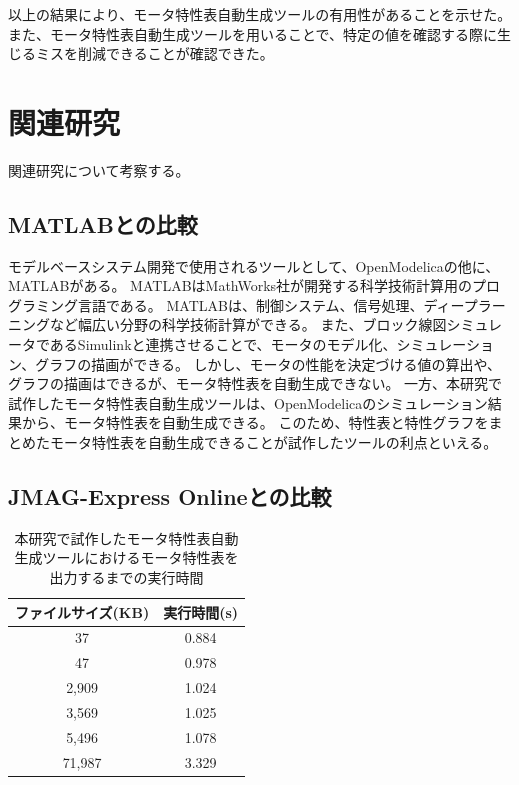 以上の結果により、モータ特性表自動生成ツールの有用性があることを示せた。また、モータ特性表自動生成ツールを用いることで、特定の値を確認する際に生じるミスを削減できることが確認できた。

\section{関連研究}
関連研究について考察する。

\subsection{MATLABとの比較}
モデルベースシステム開発で使用されるツールとして、OpenModelicaの他に、MATLAB\cite{}がある。
MATLABはMathWorks社が開発する科学技術計算用のプログラミング言語である。
MATLABは、制御システム、信号処理、ディープラーニングなど幅広い分野の科学技術計算ができる。
また、ブロック線図シミュレータであるSimulink\cite{}と連携させることで、モータのモデル化、シミュレーション、グラフの描画ができる。
しかし、モータの性能を決定づける値の算出や、グラフの描画はできるが、モータ特性表を自動生成できない。
一方、本研究で試作したモータ特性表自動生成ツールは、OpenModelicaのシミュレーション結果から、モータ特性表を自動生成できる。
このため、特性表と特性グラフをまとめたモータ特性表を自動生成できることが試作したツールの利点といえる。


\subsection{JMAG-Express Onlineとの比較}
\begin{table}[t]
	\centering
	\caption{本研究で試作したモータ特性表自動生成ツールにおけるモータ特性表を出力するまでの実行時間}
	\begin{tabular}{|c|c|} \hline
	  ファイルサイズ(KB) & 実行時間(s)\\ \hline \hline
	  37 & 0.884 \\ \hline
	  47 &  0.978\\ \hline
	  2,909 &  1.024 \\ \hline
	  3,569 & 1.025 \\ \hline
	  5,496 &  1.078\\ \hline
	  71,987 &  3.329 \\ \hline
	\end{tabular}
	\label{tab:executionTime}
  \end{table}

